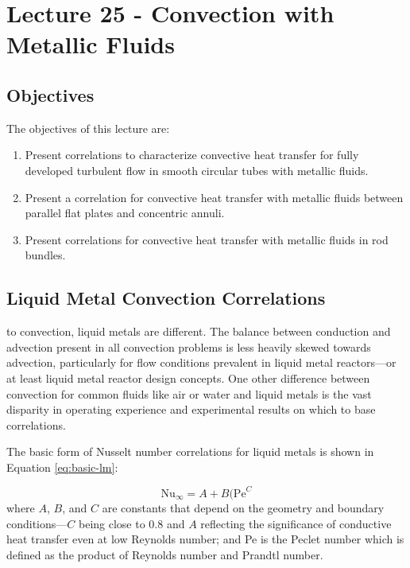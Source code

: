 \chapter{Lecture 25 - Convection with Metallic Fluids}
\label{ch:ch25}
\section{Objectives}
The objectives of this lecture are:
\begin{enumerate}
\item Present correlations to characterize convective heat transfer for fully developed turbulent flow in smooth circular tubes with metallic fluids.
\item Present a correlation for convective heat transfer with metallic fluids between parallel flat plates and concentric annuli.
\item Present correlations for convective heat transfer with metallic fluids in rod bundles.
\end{enumerate}

\section{Liquid Metal Convection Correlations}
 to convection, liquid metals are different.  The balance between conduction and advection present in all convection problems is less heavily skewed towards advection, particularly for flow conditions prevalent in liquid metal reactors---or at least liquid metal reactor design concepts.  One other difference between convection for common fluids like air or water and liquid metals is the vast disparity in operating experience and experimental results on which to base correlations.  

The basic form of Nusselt number correlations for liquid metals is shown in Equation \ref{eq:basic-lm}:

\begin{equation}
\text{Nu}_{\infty} = A + B(\text{Pe}^{C}
\label{eq:basic-lm}
\end{equation}
where $A$, $B$, and $C$ are constants that depend on the geometry  and boundary conditions---$C$ being close to 0.8 and $A$ reflecting the significance of conductive heat transfer even at low Reynolds number; and Pe is the Peclet number which is defined as the product of Reynolds number and Prandtl number. 

